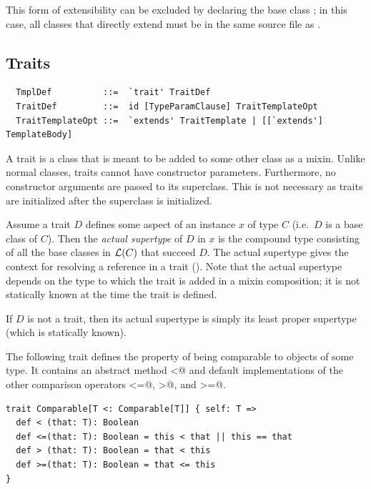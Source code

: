 This form of extensibility can be excluded by declaring the base class
 ; in this case, all classes that
directly extend  must be in the same source file as
.

\subsection{Traits}
\label{sec:traits}

\syntax\begin{lstlisting}
  TmplDef          ::=  `trait' TraitDef
  TraitDef         ::=  id [TypeParamClause] TraitTemplateOpt
  TraitTemplateOpt ::=  `extends' TraitTemplate | [[`extends'] TemplateBody]
\end{lstlisting}

A trait is a class that is meant to be added to some other class
as a mixin. Unlike normal classes, traits cannot have
constructor parameters. Furthermore, no constructor arguments are
passed to its superclass. This is not necessary as traits are
initialized after the superclass is initialized.

Assume a trait $D$ defines some aspect of an instance $x$ of
type $C$ (i.e.\ $D$ is a base class of $C$). Then the {\em actual
supertype} of $D$ in $x$ is the compound type consisting of all the
base classes in ${\cal L}(C)$ that succeed $D$.  The actual supertype gives
the context for resolving a  reference in a trait
(). Note that the actual supertype depends 
on the type to which the trait is added in a mixin composition; it is not
statically known at the time the trait is defined.

If $D$ is not a trait, then its actual supertype is simply its
least proper supertype (which is statically known).

\example\label{ex:comparable} The following trait defines the property
of being comparable to objects of some type. It contains an abstract
method \lstinline@<@ and default implementations of the other
comparison operators \lstinline@<=@, \lstinline@>@, and
\lstinline@>=@. 

\begin{lstlisting}
trait Comparable[T <: Comparable[T]] { self: T =>
  def < (that: T): Boolean
  def <=(that: T): Boolean = this < that || this == that
  def > (that: T): Boolean = that < this 
  def >=(that: T): Boolean = that <= this
}
\end{lstlisting}

